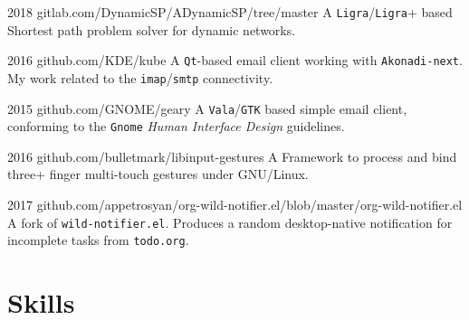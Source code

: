 \documentclass{CurriculumVitae}
\begin{document}
{2018}
{gitlab.com/DynamicSP/ADynamicSP/tree/master}
{A \texttt{Ligra}/\texttt{Ligra}+ based Shortest path problem solver for dynamic networks. }

{2016}
{github.com/KDE/kube}
{A \texttt{Qt}-based email client working with \texttt{Akonadi-next}. My work related to the \texttt{imap}/\texttt{smtp} connectivity. }

{2015}
{github.com/GNOME/geary}
{A \texttt{Vala}/\texttt{GTK} based simple email client, conforming to the \texttt{Gnome} \emph{Human Interface Design} guidelines.}

{2016}
{github.com/bulletmark/libinput-gestures}
{A Framework to process and bind three+ finger multi-touch gestures under GNU/Linux. }

{2017}
{github.com/appetrosyan/org-wild-notifier.el/blob/master/org-wild-notifier.el}
{A fork of \texttt{wild-notifier.el}. Produces a random desktop-native notification for incomplete tasks from \texttt{todo.org}. }



\section*{Skills}
\end{document}
